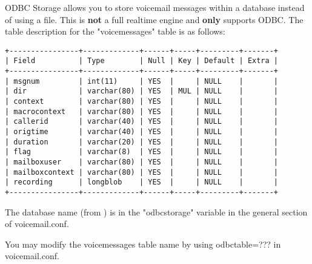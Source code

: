 

ODBC Storage allows you to store voicemail messages within a database 
instead of using a file.  This is \textbf{not} a full realtime engine and 
\textbf{only} supports ODBC.  The table description for the "voicemessages" 
table is as follows:

\begin{verbatim}
+----------------+-------------+------+-----+---------+-------+
| Field          | Type        | Null | Key | Default | Extra |
+----------------+-------------+------+-----+---------+-------+
| msgnum         | int(11)     | YES  |     | NULL    |       |
| dir            | varchar(80) | YES  | MUL | NULL    |       |
| context        | varchar(80) | YES  |     | NULL    |       |
| macrocontext   | varchar(80) | YES  |     | NULL    |       |
| callerid       | varchar(40) | YES  |     | NULL    |       |
| origtime       | varchar(40) | YES  |     | NULL    |       |
| duration       | varchar(20) | YES  |     | NULL    |       |
| flag           | varchar(8)  | YES  |     | NULL    |       |
| mailboxuser    | varchar(80) | YES  |     | NULL    |       |
| mailboxcontext | varchar(80) | YES  |     | NULL    |       |
| recording      | longblob    | YES  |     | NULL    |       |
+----------------+-------------+------+-----+---------+-------+
\end{verbatim}

The database name (from ) is in the 
"odbcstorage" variable in the general section of voicemail.conf.

You may modify the voicemessages table name by using 
odbctable=??? in voicemail.conf.


